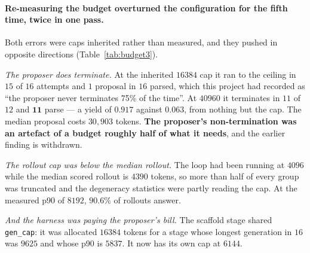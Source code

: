 \paragraph{Re-measuring the budget overturned the configuration for the fifth time, twice in
one pass.} Both errors were caps inherited rather than measured, and they pushed in opposite
directions (Table~\ref{tab:budget3}).

\emph{The proposer does terminate.} At the inherited $16384$ cap it ran to the ceiling in $15$
of $16$ attempts and $1$ proposal in $16$ parsed, which this project had recorded as ``the
proposer never terminates 75\% of the time''. At $40960$ it terminates in $11$ of $12$ and
$\mathbf{11}$ parse --- a yield of $0.917$ against $0.063$, from nothing but the cap. The
median proposal costs $30{,}903$ tokens. \textbf{The proposer's non-termination was an artefact
of a budget roughly half of what it needs}, and the earlier finding is withdrawn.

\emph{The rollout cap was below the median rollout.} The loop had been running at $4096$ while
the median scored rollout is $4390$ tokens, so more than half of every group was truncated and
the degeneracy statistics were partly reading the cap. At the measured p90 of $8192$, $90.6\%$
of rollouts answer.

\emph{And the harness was paying the proposer's bill.} The scaffold stage shared
\texttt{gen\_cap}: it was allocated $16384$ tokens for a stage whose longest generation in $16$
was $9625$ and whose p90 is $5837$. It now has its own cap at $6144$.


